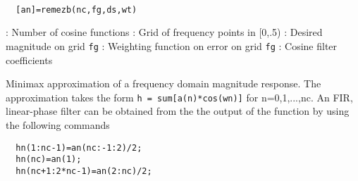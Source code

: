 \begin{mandesc}
   \\ %
\end{mandesc}
\begin{calling_sequence}
\begin{verbatim}
  [an]=remezb(nc,fg,ds,wt)  
\end{verbatim}
\end{calling_sequence}
\begin{parameters}
  \begin{varlist}
    : Number of cosine functions
    : Grid of frequency points in [0,.5)
      : Desired magnitude on grid \verb!fg!
      : Weighting function on error on grid \verb!fg!
      : Cosine filter coefficients
  \end{varlist}
\end{parameters}
\begin{mandescription}
  Minimax approximation of a frequency domain
  magnitude response. The approximation takes
  the form \verb!h = sum[a(n)*cos(wn)]!
  for n=0,1,...,nc. An FIR, linear-phase filter
  can be obtained from the the output of the function
  by using the following commands
\begin{verbatim}
  hn(1:nc-1)=an(nc:-1:2)/2;
  hn(nc)=an(1);
  hn(nc+1:2*nc-1)=an(2:nc)/2;
\end{verbatim}
\end{mandescription}
